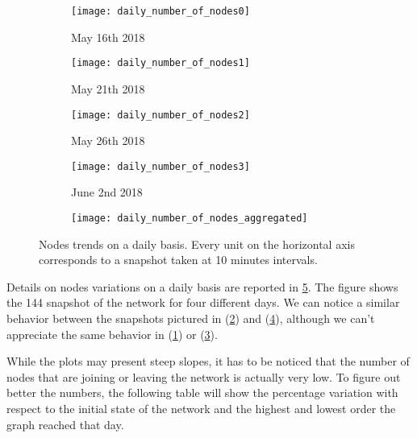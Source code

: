	\begin{figure}[htbp!]
		\centering
		\begin{subfigure}{0.45\textwidth}
			\centering
			\texttt{[image: daily\_number\_of\_nodes0]}
			\caption{May 16th 2018}
			\label{daily_node0}
		\end{subfigure}
		\begin{subfigure}{0.45\textwidth}
			\centering
			\texttt{[image: daily\_number\_of\_nodes1]}
			\caption{May 21th 2018}
			\label{daily_node1}
		\end{subfigure}
			\begin{subfigure}{0.45\textwidth}
			\centering
			\texttt{[image: daily\_number\_of\_nodes2]}
			\caption{May 26th 2018}
			\label{daily_node2}
		\end{subfigure}
		\begin{subfigure}{0.45\textwidth}
			\centering
			\texttt{[image: daily\_number\_of\_nodes3]}
			\caption{June 2nd 2018}
			\label{daily_node3}
		\end{subfigure}
		\begin{subfigure}{\textwidth}
			\centering
			\texttt{[image: daily\_number\_of\_nodes\_aggregated]}
			\caption{}
		\end{subfigure}
		
		\caption{Nodes trends on a daily basis. Every unit on the horizontal axis corresponds to a snapshot taken at 10 minutes intervals.}
		\label{daily_nodes_variation}
	\end{figure}

	Details on nodes variations on a daily basis are reported in \ref{daily_nodes_variation}. The figure shows the 144 snapshot of the network for four different days. We can notice a similar behavior between the snapshots pictured in (\ref{daily_node1}) and (\ref{daily_node3}), although we can't appreciate the same behavior in (\ref{daily_node0}) or (\ref{daily_node2}). 
	
	While the plots may present steep slopes, it has to be noticed that the number of nodes that are joining or leaving the network is actually very low. To figure out better the numbers, the following table will show the percentage variation with respect to the initial state of the network and the highest and lowest order the graph reached that day.
	
